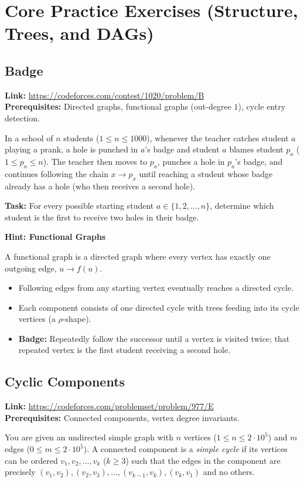 \documentclass[12pt]{article}
\begin{document}
\section{Core Practice Exercises (Structure, Trees, and DAGs)}

\subsection{Badge}
\textbf{Link:} \url{https://codeforces.com/contest/1020/problem/B} \\
\textbf{Prerequisites:} Directed graphs, functional graphs (out-degree $1$), cycle entry detection.

In a school of $n$ students ($1 \le n \le 1000$), whenever the teacher catches student $a$ playing a prank, a hole is punched in $a$'s badge and student $a$ blames student $p_a$ ($1 \le p_a \le n$). The teacher then moves to $p_a$, punches a hole in $p_a$'s badge, and continues following the chain $x \to p_x$ until reaching a student whose badge already has a hole (who then receives a second hole).

\textbf{Task:} For every possible starting student $a \in \{1, 2, \dots, n\}$, determine which student is the first to receive two holes in their badge.

\textbf{Hint: Functional Graphs}

A functional graph is a directed graph where every vertex has exactly one outgoing edge, $u \to f(u)$.
\begin{itemize}
    \item Following edges from any starting vertex eventually reaches a directed cycle.
    \item Each component consists of one directed cycle with trees feeding into its cycle vertices (a $\rho$-shape).
    \item \textbf{Badge:} Repeatedly follow the successor until a vertex is visited twice; that repeated vertex is the first student receiving a second hole.
\end{itemize}

\subsection{Cyclic Components}
\textbf{Link:} \url{https://codeforces.com/problemset/problem/977/E} \\
\textbf{Prerequisites:} Connected components, vertex degree invariants.

You are given an undirected simple graph with $n$ vertices ($1 \le n \le 2 \cdot 10^5$) and $m$ edges ($0 \le m \le 2 \cdot 10^5$). A connected component is a \textit{simple cycle} if its vertices can be ordered $v_1, v_2, \dots, v_k$ ($k \ge 3$) such that the edges in the component are precisely $(v_1, v_2), (v_2, v_3), \dots, (v_{k-1}, v_k), (v_k, v_1)$ and no others.
\end{document}

